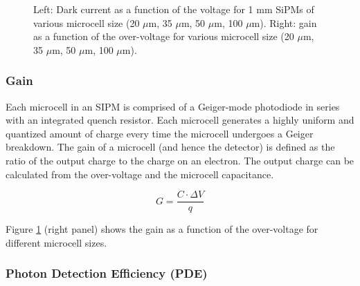 \begin{figure}[!bhtp]
	\caption{\label{fig.sipp1} Left: Dark current as a function of the voltage for 1 mm SiPMs of various microcell size (20 $\mu$m, 35 $\mu$m, 50 $\mu$m, 100 $\mu$m). Right: gain as a function of the over-voltage for various microcell size (20 $\mu$m, 35 $\mu$m, 50 $\mu$m, 100 $\mu$m).}
\end{figure}
\subsubsection*{Gain}

Each microcell in an SIPM is comprised of a Geiger-mode photodiode in series with an integrated quench resistor. Each microcell generates a highly uniform and quantized amount of charge every time the microcell undergoes a Geiger breakdown. The gain of a microcell (and hence the detector) is defined as the ratio of the output charge to the charge on an electron. The output charge can be calculated from the over-voltage and the microcell capacitance.

\begin{equation}
G = \frac{C \cdot \Delta V}{q}
\end{equation}

Figure \ref{fig.sipp1} (right panel) shows the gain as a function of the over-voltage  for
different microcell sizes. 

\subsubsection*{Photon Detection Efficiency (PDE)}

